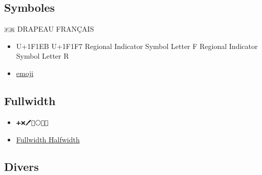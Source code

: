 \documentclass[
  a4paper,
]{book}
\providecommand{\tightlist}{%
  \setlength{\itemsep}{0pt}\setlength{\parskip}{0pt}}
\begin{document}
\hypertarget{symboles}{%
\subsection{Symboles}\label{symboles}}

\texttt{🇫🇷} DRAPEAU FRANÇAIS

\begin{itemize}
\tightlist
\item
  U+1F1EB U+1F1F7 Regional Indicator Symbol Letter F Regional Indicator Symbol Letter R
\item
  \href{https://unicode.org/emoji/charts/full-emoji-list.html}{emoji}
\end{itemize}

\hypertarget{fullwidth}{%
\subsection{Fullwidth}\label{fullwidth}}

\begin{itemize}
\tightlist
\item
  \texttt{➕❌🖊️🔲⚪✅💑}
\item
  \href{https://www.fileformat.info/info/unicode/block/halfwidth_and_fullwidth_forms/list.htm}{Fullwidth Halfwidth}
\end{itemize}

\hypertarget{divers}{%
\subsection{Divers}\label{divers}}
\end{document}
